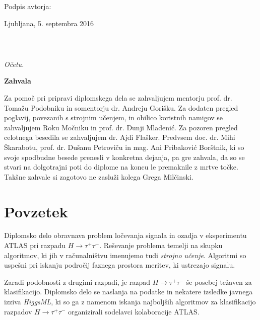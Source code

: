 \vspace{1cm}
\hspace{9cm} Podpis avtorja:

\vspace{2cm}

Ljubljana, 5. septembra 2016 
\newpage

\ \thispagestyle{empty}
\newpage

\thispagestyle{empty}

$\;$ 

\vspace{5cm}
\hfill {\Large \em Očetu.}
\thispagestyle{empty}

\vfill
{\LARGE \textbf{Zahvala}}
\vspace{0.5cm}

Za pomoč pri pripravi diplomskega dela se zahvaljujem mentorju prof. dr. Tomažu Podobniku in somentorju dr. Andreju Gorišku. Za dodaten pregled poglavij, povezanih s strojnim učenjem, in obilico koristnih namigov se zahvaljujem Roku Močniku in prof. dr. Dunji Mladenić. Za pozoren pregled celotnega besedila se zahvaljujem dr. Ajdi Flašker. Predvsem doc. dr. Mihi Škarabotu, prof. dr. Dušanu Petroviču in mag. Ani Pribaković Borštnik, ki so svoje spodbudne besede prenesli v konkretna dejanja, pa gre zahvala, da so se stvari na dolgotrajni poti do diplome na koncu le premaknile z mrtve točke. Takšne zahvale si zagotovo ne zasluži kolega Grega Milčinski.



\newpage
\setlength{\parindent}{0.7cm}
\setlength{\parskip}{0.1cm}


\chapter*{Povzetek}
\noindent Diplomsko delo obravnava problem ločevanja signala in ozadja v eksperimentu ATLAS pri razpadu $H \rightarrow \tau^+\tau^-$. Reševanje problema temelji na skupku algoritmov, ki jih v računalništvu imenujemo tudi \textit{strojno učenje}. Algoritmi so uspešni pri iskanju področij faznega prostora meritev, ki ustrezajo signalu.

Zaradi podobnosti z drugimi razpadi, je razpad $H \rightarrow \tau^+\tau^-$ še posebej težaven za klasifikacijo. Diplomsko delo se naslanja na podatke in nekatere izsledke javnega izziva \textit{HiggsML}, ki so ga z namenom iskanja najboljših algoritmov za klasifikacijo razpadov $H \rightarrow \tau^+\tau^-$ organizirali sodelavci kolaboracije ATLAS.

